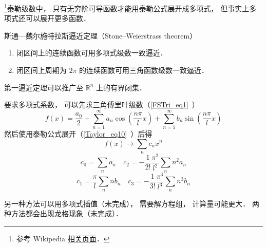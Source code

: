 

\footnote{参考 Wikipedia \href{https://en.wikipedia.org/wiki/Stone–Weierstrass theorem}{相关页面}．}泰勒级数中， 只有无穷阶可导函数才能用泰勒公式展开成多项式， 但事实上多项式还可以展开更多函数．

\begin{theorem}{斯通—魏尔施特拉斯逼近定理（Stone–Weierstrass theorem）}
\begin{enumerate}
斯通—魏尔施特拉斯逼近定理有两个
\item 闭区间上的连续函数可用多项式级数一致逼近．
\item 闭区间上周期为 $2\pi$ 的连续函数可用三角函数级数一致逼近．
\end{enumerate}
第一逼近定理可以推广至 $\mathbb {R}^{n}$ 上的有界闭集．
\end{theorem}

要求多项式系数， 可以先求三角傅里叶级数（\autoref{FSTri_eq1}~）
\begin{equation}
f(x) = \frac{a_0}{2} + \sum_{n = 1}^\infty a_n \cos (\frac{n\pi}{l}x) + \sum_{n = 1}^\infty b_n \sin (\frac{n\pi}{l}x)
\end{equation}
然后使用泰勒公式展开（\autoref{Taylor_eq10}~）后得
\begin{equation}
f(x) \to \sum_n c_n x^n
\end{equation}
\begin{equation}
c_0 = \sum_n a_n
\quad
c_2 = -\frac{1}{2!}\frac{\pi^2}{l^2} \sum_n n^2 a_n
\end{equation}
\begin{equation}
c_1 = \frac{\pi}{l} \sum_n n b_n
\quad
c_3 = -\frac{1}{3!}\frac{\pi^3}{l^3} \sum_n n^3 b_n
\end{equation}

另一种方法可以用多项式插值（未完成）， 需要解方程组， 计算量可能更大． 两种方法都会出现龙格现象（未完成）．
